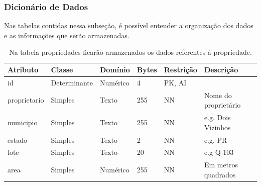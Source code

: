 \subsubsection{Dicionário de Dados}
\label{sec:titSecDiagERDicionario}

Nas tabelas contidas nessa subseção, é possível entender a organização dos dados e as informações que serão armazenadas.

\begin{landscape}
    \label{sec:titSubSecPropriedades}

    \begin{table}[H]
        \centering
        \caption[Tabela propriedades]{Na tabela propriedades ficarão armazenados os dados referentes à propriedade.
            \label{tab:tabela-er-propriedades}}
        \begin{tabular}{|p{4cm}|p{3cm}|p{2cm}|p{1cm}|p{2cm}|p{8cm}|}
            \hline
            Atributo     & Classe       & Domínio  & Bytes & Restrição & Descrição            \\\hline
            id           & Determinante & Numérico & 4     & PK, AI    &                      \\\hline
            proprietario & Simples      & Texto    & 255   & NN        & Nome do proprietário \\\hline
            municipio    & Simples      & Texto    & 255   & NN        & e.g. Dois Vizinhos   \\\hline
            estado       & Simples      & Texto    & 2     & NN        & e.g. PR              \\\hline
            lote         & Simples      & Texto    & 20    & NN        & e.g Q-103            \\\hline
            area         & Simples      & Numérico & 255   & NN        & Em metros quadrados  \\\hline
        \end{tabular}
    \end{table}

    \label{sec:titSubSecTalhoes}


\end{landscape}

